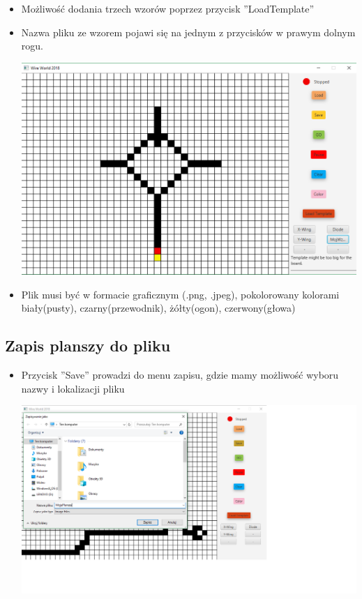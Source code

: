 \documentclass[a4paper,11pt]{article}
\begin{document}
\begin{itemize}
\item Możliwość dodania trzech wzorów poprzez przycisk ''LoadTemplate''
\item Nazwa pliku ze wzorem pojawi się na jednym z przycisków w prawym dolnym rogu.

\includegraphics[width=\textwidth]{addWzor2}
\item Plik musi być w formacie graficznym (.png, .jpeg), pokolorowany kolorami biały(pusty), czarny(przewodnik), żółty(ogon), czerwony(głowa)
\end{itemize}

\subsection{Zapis planszy do pliku}
\begin{itemize}
\item Przycisk ''Save'' prowadzi do menu zapisu, gdzie mamy możliwość wyboru nazwy i lokalizacji pliku

\includegraphics[width=\textwidth]{zapis}
\end{itemize}
\end{document}
